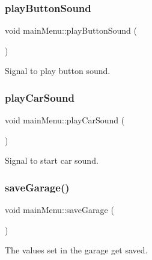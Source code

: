 \subsubsection{\texorpdfstring{playButtonSound}{playButtonSound}}
{\footnotesize\ttfamily void main\+Menu\+::play\+Button\+Sound (\begin{DoxyParamCaption}{ }\end{DoxyParamCaption})\hspace{0.3cm}{\ttfamily [signal]}}



Signal to play button sound. 

\mbox{\label{classmain_menu_ae546b1a2986ffe574f5e90d66f16f7b1}} 
\subsubsection{\texorpdfstring{playCarSound}{playCarSound}}
{\footnotesize\ttfamily void main\+Menu\+::play\+Car\+Sound (\begin{DoxyParamCaption}{ }\end{DoxyParamCaption})\hspace{0.3cm}{\ttfamily [signal]}}



Signal to start car sound. 

\mbox{\label{classmain_menu_a3be635fe4ff021549ee65464ffc7a21e}} 
\subsubsection{\texorpdfstring{saveGarage()}{saveGarage()}}
{\footnotesize\ttfamily void main\+Menu\+::save\+Garage (\begin{DoxyParamCaption}{ }\end{DoxyParamCaption})}



The values set in the garage get saved. 

\mbox{\label{classmain_menu_a8d2ff09cb3152199cb875090bdf94df1}} 
